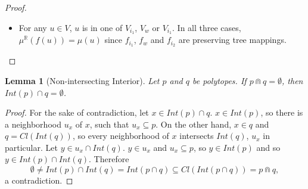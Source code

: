 \documentclass{article}
\newtheorem*{lemma}{Lemma}
\newcommand{\R}{\mathbb{R}}
\newcommand{\bcap}{\Cap}
\begin{document}
\begin{proof}
\begin{itemize}
\begin{itemize}
    Either way, $f(u_1) \bcap f(u_2) = \emptyset$, so the contact property also holds.

  \item Suppose $u_1$ is in $V_w$ and $u_2$ in $V_{i_1}$. Then $f(u_1) \subseteq (-\infty, 0]$ and $f(u_2) \subseteq [0, \mu(V_w)]$. Of course, $f(u_1) \bcap f(u_2) = \emptyset$. $f(u_1) \cap f(u_2) \neq \emptyset$ holds by the construction of the lemma exactly if $u_1 = i_1$ and $u_2 = w_1$, in  which case $\{u_1, u_2\} \in E$.

    A similar argument is made if $u_1$ and $u_2$ switch places above or if $u_1$ is in $V_{i_2}$ and $u_2$ is in $V_w$ or the other way around.
      \end{itemize}
    \item For any $u \in V$, $u$ is in one of $V_{i_1}$, $V_w$ or $V_{i_1}$. In all three cases, $\mu^\R(f(u)) = \mu(u)$ since $f_{i_1}$, $f_w$ and $f_{i_2}$ are preserving tree mappings.
    \end{itemize}
\end{proof}

\begin{lemma}[Non-intersecting Interior]
  Let $p$ and $q$ be polytopes. If $p \bcap q = \emptyset$, then $Int(p) \cap q = \emptyset$.
\end{lemma}
\begin{proof}
  For the sake of contradiction, let $x \in Int(p) \cap q$. $x \in Int(p)$, so there is a neighborhood $u_x$ of $x$, such that $u_x \subseteq p$. On the other hand, $x \in q$ and $q = Cl(Int(q))$, so every neighborhood of $x$ intersects $Int(q)$, $u_x$ in particular. Let $y \in u_x \cap Int(q)$. $y \in u_x$ and $u_x \subseteq p$, so $y \in Int(p)$ and so $y \in Int(p) \cap Int(q)$. Therefore \[\emptyset \neq Int(p) \cap Int(q) = Int(p \cap q) \subseteq Cl(Int(p \cap q)) = p \bcap q,\] a contradiction.
\end{proof}
\end{document}
